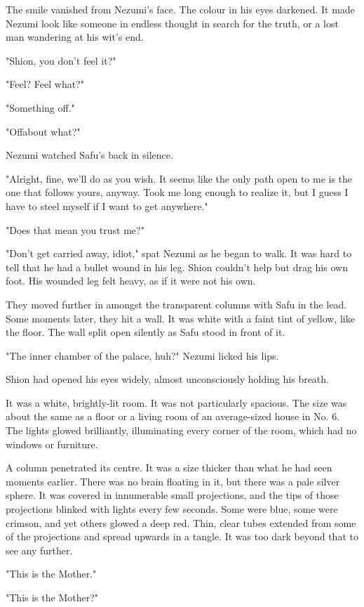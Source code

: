 The smile vanished from Nezumi's face. The colour in his eyes darkened.
It made Nezumi look like someone in endless thought in search for the
truth, or a lost man wandering at his wit's end.

"Shion, you don't feel it?"

"Feel? Feel what?"

"Something off."

"Off\el about what?"

Nezumi watched Safu's back in silence.

"Alright, fine, we'll do as you wish. It seems like the only path open
to me is the one that follows yours, anyway. Took me long enough to
realize it, but I guess I have to steel myself if I want to get
anywhere."

"Does that mean you trust me?"

"Don't get carried away, idiot," spat Nezumi as he began to walk. It was
hard to tell that he had a bullet wound in his leg. Shion couldn't help
but drag his own foot. His wounded leg felt heavy, as if it were not his
own.

They moved further in amongst the transparent columns with Safu in the
lead. Some moments later, they hit a wall. It was white with a faint
tint of yellow, like the floor. The wall split open silently as Safu
stood in front of it.

"The inner chamber of the palace, huh?" Nezumi licked his lips.

Shion had opened his eyes widely, almost unconsciously holding his
breath.

It was a white, brightly-lit room. It was not particularly spacious. The
size was about the same as a floor or a living room of an average-sized
house in No. 6. The lights glowed brilliantly, illuminating every corner
of the room, which had no windows or furniture.

A column penetrated its centre. It was a size thicker than what he had
seen moments earlier. There was no brain floating in it, but there was a
pale silver sphere. It was covered in innumerable small projections, and
the tips of those projections blinked with lights every few seconds.
Some were blue, some were crimson, and yet others glowed a deep red.
Thin, clear tubes extended from some of the projections and spread
upwards in a tangle. It was too dark beyond that to see any further.

"This is the Mother."

"This is the Mother?"

